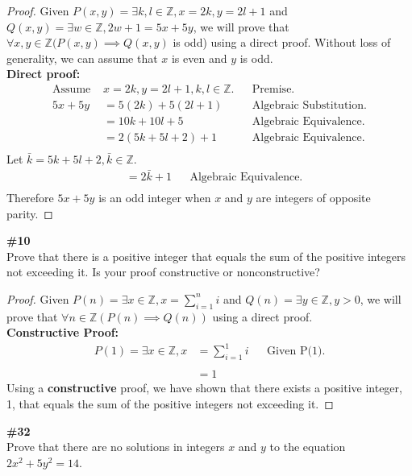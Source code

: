 \documentclass{article}
\newcommand{\problem}[1]{\textbf{\##1}\\}
\newcommand{\AllIntegers}{\mathbb{Z}}
\begin{document}
\begin{proof}
    Given \(P(x,y) = \exists k,l \in \AllIntegers, x = 2k, y = 2l+1\) and \(Q(x,y) = \exists w \in \AllIntegers, 2w + 1 = 5x + 5y\), we will prove that \(\forall x,y \in \AllIntegers(P(x,y)\implies Q(x,y)\) is odd) using a direct proof. Without loss of generality, we can assume that \(x\) is even and \(y\) is odd.\\
    \textbf{Direct proof:}
    \begin{align*}
        \text{Assume } &x = 2k, y = 2l + 1, k,l \in \AllIntegers.&&\text{Premise.}\\
        5x + 5y &= 5(2k) + 5(2l + 1)&&\text{Algebraic Substitution.}\\
        &= 10k + 10l + 5&&\text{Algebraic Equivalence.}\\
        &= 2(5k + 5l + 2) + 1&&\text{Algebraic Equivalence.}\\
    \end{align*}
    Let \(\bar{k} = 5k + 5l + 2, \bar{k} \in \AllIntegers\).
    \begin{align*}
        &= 2\bar{k} + 1&&\text{Algebraic Equivalence.}\\
    \end{align*}
    Therefore \(5x + 5y\) is an odd integer when \(x\) and \(y\) are integers of opposite parity.
\end{proof}

\pagebreak
\problem{10}
Prove that there is a positive integer that equals the sum of the positive integers not exceeding it. Is your proof constructive or nonconstructive?

\begin{proof}
    Given \(P(n) = \exists x \in \AllIntegers, x = \sum_{i=1}^{n}i\) and \(Q(n) = \exists y \in \AllIntegers, y > 0\), we will prove that \(\forall n \in \AllIntegers(P(n)\implies Q(n))\) using a direct proof.\\
    \textbf{Constructive Proof:}
    \begin{align*}
        P(1)=\exists x \in \AllIntegers, x &= \sum_{i=1}^{1}i&&\text{Given P(1).}\\\\ &=1&&
    \end{align*}
    Using a \textbf{constructive} proof, we have shown that there exists a positive integer, 1, that equals the sum of the positive integers not exceeding it.
\end{proof}

\pagebreak
\problem{32}
Prove that there are no solutions in integers \(x\) and \(y\) to the equation \(2x^2 + 5y^2 = 14\).
\end{document}
